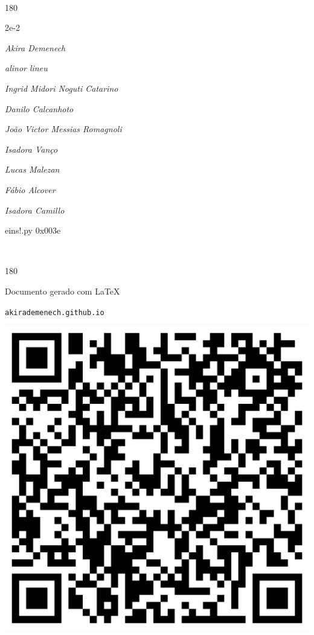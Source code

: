 \documentclass[12pt]{article}
\begin{document}
	\ 
	\vfill
	\begin{turn}{180}	
		\begin{minipage}{\textwidth}
		  	\ttfamily %
			\centering
			{\Huge 2e-2}
		  
			\hfill
		  
			

\textit{\small Akira Demenech}

\textit{\small alinor lineu}

\textit{\small Ingrid Midori Noguti Catarino}

\textit{\small Danilo Calcanhoto}

\textit{\small João Victor Messias Romagnoli}

\textit{\small Isadora Vanço}

\textit{\small Lucas Malezan}

\textit{\small Fábio Alcover}

\textit{\small Isadora Camillo}

\bigskip

eins!.py
0x003e


		\end{minipage}	
	\end{turn}
	\vfill
	\

\pagebreak

	\begin{turn}{180}	
		\begin{minipage}{\textwidth}		  
		  Documento gerado com \LaTeX			
		  
		  \texttt{akirademenech.github.io}

		  \includegraphics[height=0.3\textheight]{2e-2.pdf}

		\end{minipage}	
	\end{turn}  
		  
\end{document}
